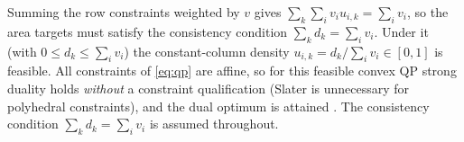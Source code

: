 \documentclass[11pt,a4paper]{article}
\begin{document}
\begin{remark}
\label{rem:feasible}
Summing the row constraints weighted by $v$ gives $\sum_k\sum_i v_i u_{i,k}=\sum_i v_i$, so
the area targets must satisfy the consistency condition $\sum_k d_k=\sum_i v_i$. Under it
(with $0\le d_k\le\sum_i v_i$) the constant-column density $u_{i,k}=d_k/\sum_i v_i\in[0,1]$
is feasible. All constraints of \eqref{eq:qp} are affine, so for this feasible convex QP
strong duality holds \emph{without} a constraint qualification (Slater is unnecessary for
polyhedral constraints), and the dual optimum is attained \cite{bertsekas1999nonlinear}. The
consistency condition $\sum_k d_k=\sum_i v_i$ is assumed throughout.
\end{remark}

\end{document}
